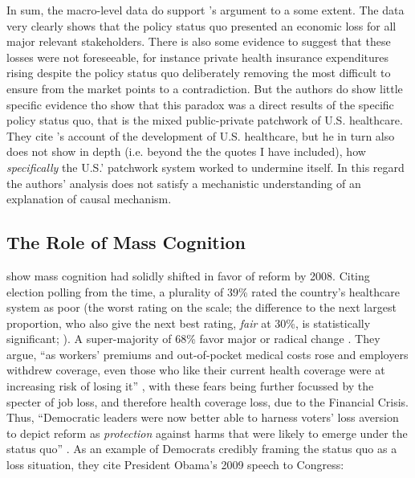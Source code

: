 \documentclass[11pt]{article}
\begin{document}
In sum, the macro-level data do support \citeauthor{Jacobs2014}'s \parencite*{Jacobs2014} argument to a some extent. The data very clearly shows that the policy status quo presented an economic loss for all major relevant stakeholders. There is also some evidence to suggest that these losses were not foreseeable, for instance private health insurance expenditures rising despite the policy status quo deliberately removing the most difficult to ensure from the market points to a contradiction. But the authors do show little specific evidence tho show that this paradox was a direct results of the specific policy status quo, that is the mixed public-private patchwork of U.S. healthcare. They cite \citeauthor[][]{Hacker1998}'s \parencite*{Hacker1998} account of the development of U.S. healthcare, but he in turn also does not show in depth (i.e. beyond the the quotes I have included), how \textit{specifically} the U.S.' patchwork system worked to undermine itself. In this regard the authors' analysis does not satisfy a mechanistic understanding of an explanation of causal mechanism.

\subsection*{The Role of Mass Cognition}

\textcite[][]{Jacobs2014} show mass cognition had solidly shifted in favor of reform by 2008. Citing election polling from the time, a plurality of 39\% rated the country's healthcare system as poor (the worst rating on the scale; the difference to the next largest proportion, who also give the next best rating, \textit{fair} at 30\%, is statistically significant; ). A super-majority of 68\% favor major or radical change \parencite[][p. 2058]{Blendon2008}. They argue, \enquote{as workers' premiums and out-of-pocket medical costs rose and employers withdrew coverage, even those who like their current health coverage were at increasing risk of losing it} , with these fears being further focussed by the specter of job loss, and therefore health coverage loss, due to the Financial Crisis. Thus, \enquote{Democratic leaders were now better able to harness voters' loss aversion to depict reform as \textit{protection} against harms that were likely to emerge under the status quo} . As an example of Democrats credibly framing the status quo as a loss situation, they cite President Obama's 2009 speech to Congress:
\end{document}

